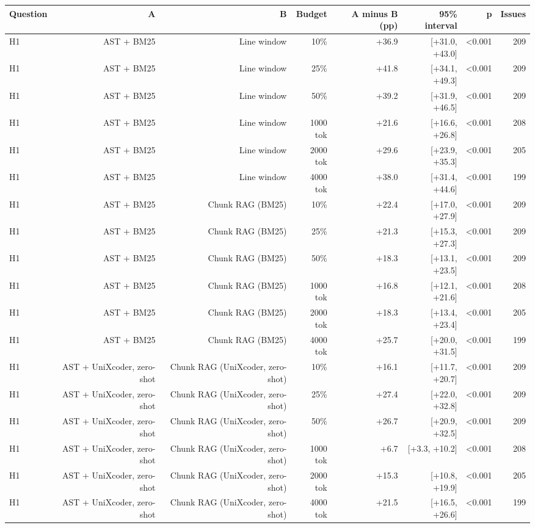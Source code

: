 \begin{tabular}{lrrrrrrr}
\toprule
Question & A & B & Budget & A minus B (pp) & 95\% interval & p & Issues \\
\midrule
H1 & AST + BM25 & Line window & 10\% & +36.9 & [+31.0, +43.0] & <0.001 & 209 \\
H1 & AST + BM25 & Line window & 25\% & +41.8 & [+34.1, +49.3] & <0.001 & 209 \\
H1 & AST + BM25 & Line window & 50\% & +39.2 & [+31.9, +46.5] & <0.001 & 209 \\
H1 & AST + BM25 & Line window & 1000 tok & +21.6 & [+16.6, +26.8] & <0.001 & 208 \\
H1 & AST + BM25 & Line window & 2000 tok & +29.6 & [+23.9, +35.3] & <0.001 & 205 \\
H1 & AST + BM25 & Line window & 4000 tok & +38.0 & [+31.4, +44.6] & <0.001 & 199 \\
H1 & AST + BM25 & Chunk RAG (BM25) & 10\% & +22.4 & [+17.0, +27.9] & <0.001 & 209 \\
H1 & AST + BM25 & Chunk RAG (BM25) & 25\% & +21.3 & [+15.3, +27.3] & <0.001 & 209 \\
H1 & AST + BM25 & Chunk RAG (BM25) & 50\% & +18.3 & [+13.1, +23.5] & <0.001 & 209 \\
H1 & AST + BM25 & Chunk RAG (BM25) & 1000 tok & +16.8 & [+12.1, +21.6] & <0.001 & 208 \\
H1 & AST + BM25 & Chunk RAG (BM25) & 2000 tok & +18.3 & [+13.4, +23.4] & <0.001 & 205 \\
H1 & AST + BM25 & Chunk RAG (BM25) & 4000 tok & +25.7 & [+20.0, +31.5] & <0.001 & 199 \\
H1 & AST + UniXcoder, zero-shot & Chunk RAG (UniXcoder, zero-shot) & 10\% & +16.1 & [+11.7, +20.7] & <0.001 & 209 \\
H1 & AST + UniXcoder, zero-shot & Chunk RAG (UniXcoder, zero-shot) & 25\% & +27.4 & [+22.0, +32.8] & <0.001 & 209 \\
H1 & AST + UniXcoder, zero-shot & Chunk RAG (UniXcoder, zero-shot) & 50\% & +26.7 & [+20.9, +32.5] & <0.001 & 209 \\
H1 & AST + UniXcoder, zero-shot & Chunk RAG (UniXcoder, zero-shot) & 1000 tok & +6.7 & [+3.3, +10.2] & <0.001 & 208 \\
H1 & AST + UniXcoder, zero-shot & Chunk RAG (UniXcoder, zero-shot) & 2000 tok & +15.3 & [+10.8, +19.9] & <0.001 & 205 \\
H1 & AST + UniXcoder, zero-shot & Chunk RAG (UniXcoder, zero-shot) & 4000 tok & +21.5 & [+16.5, +26.6] & <0.001 & 199 \\

\end{tabular}
